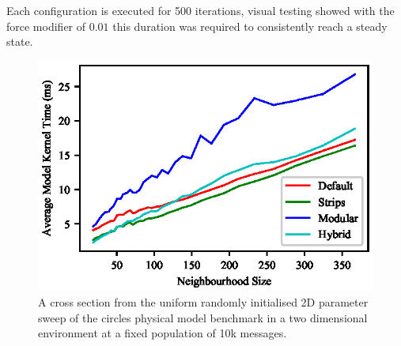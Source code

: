     Each configuration is executed for 500 iterations, visual testing showed with the force modifier of $0.01$ this duration was required to consistently reach a steady state.
        
    
\begin{figure}[!t]
\centering
\includegraphics[width=\linewidth]{../resources/results/2d/circles_10kmessage.eps}
\caption{\label{fig:graph-2d-circles-40kmessage}A cross section from the uniform randomly initialised 2D parameter sweep of the circles physical model benchmark in a two dimensional environment at a fixed population of 10k messages.}
\end{figure}

